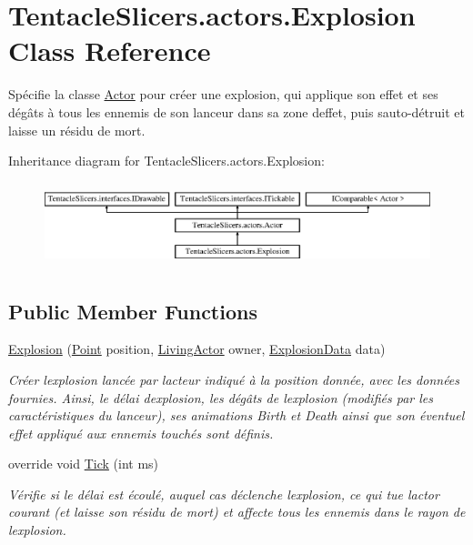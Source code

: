 \hypertarget{class_tentacle_slicers_1_1actors_1_1_explosion}{}\section{Tentacle\+Slicers.\+actors.\+Explosion Class Reference}
\label{class_tentacle_slicers_1_1actors_1_1_explosion}


Spécifie la classe \hyperlink{class_tentacle_slicers_1_1actors_1_1_actor}{Actor} pour créer une explosion, qui applique son effet et ses dégâts à tous les ennemis de son lanceur dans sa zone d\textquotesingle{}effet, puis s\textquotesingle{}auto-\/détruit et laisse un résidu de mort.  


Inheritance diagram for Tentacle\+Slicers.\+actors.\+Explosion\+:\begin{figure}[H]
\begin{center}
\leavevmode
\includegraphics[height=2.456140cm]{class_tentacle_slicers_1_1actors_1_1_explosion}
\end{center}
\end{figure}
\subsection*{Public Member Functions}
\begin{DoxyCompactItemize}
\item 
\hyperlink{class_tentacle_slicers_1_1actors_1_1_explosion_a9e1355a2064d65ee17c91414e9586fff}{Explosion} (\hyperlink{class_tentacle_slicers_1_1general_1_1_point}{Point} position, \hyperlink{class_tentacle_slicers_1_1actors_1_1_living_actor}{Living\+Actor} owner, \hyperlink{class_tentacle_slicers_1_1actors_1_1_explosion_data}{Explosion\+Data} data)
\begin{DoxyCompactList}\small\item\em Créer l\textquotesingle{}explosion lancée par l\textquotesingle{}acteur indiqué à la position donnée, avec les données fournies. Ainsi, le délai d\textquotesingle{}explosion, les dégâts de l\textquotesingle{}explosion (modifiés par les caractéristiques du lanceur), ses animations Birth et Death ainsi que son éventuel effet appliqué aux ennemis touchés sont définis. \end{DoxyCompactList}\item 
override void \hyperlink{class_tentacle_slicers_1_1actors_1_1_explosion_aeae36dfeadd7f8b7ec6a278ab4fae019}{Tick} (int ms)
\begin{DoxyCompactList}\small\item\em Vérifie si le délai est écoulé, auquel cas déclenche l\textquotesingle{}explosion, ce qui tue l\textquotesingle{}actor courant (et laisse son résidu de mort) et affecte tous les ennemis dans le rayon de l\textquotesingle{}explosion. \end{DoxyCompactList}\end{DoxyCompactItemize}
